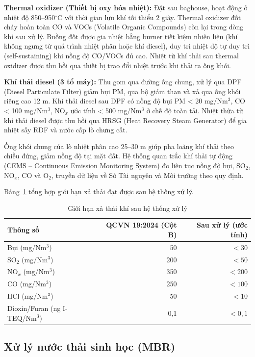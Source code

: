 \documentclass[../main.tex]{subfiles}
\begin{document}
\textbf{Thermal oxidizer (Thiết bị oxy hóa nhiệt):} Đặt sau baghouse, hoạt động ở nhiệt độ 850--950$^\circ\mathrm{C}$ với thời gian lưu khí tối thiểu 2 giây. Thermal oxidizer đốt cháy hoàn toàn CO và VOCs (Volatile Organic Compounds) còn lại trong dòng khí sau xử lý. Buồng đốt được gia nhiệt bằng burner tiết kiệm nhiên liệu (khí không ngưng từ quá trình nhiệt phân hoặc khí diesel), duy trì nhiệt độ tự duy trì (self-sustaining) khi nồng độ CO/VOCs đủ cao. Nhiệt từ khí thải sau thermal oxidizer được thu hồi qua thiết bị trao đổi nhiệt trước khi thải ra ống khói.

\textbf{Khí thải diesel (3 tổ máy):} Thu gom qua đường ống chung, xử lý qua DPF (Diesel Particulate Filter) giảm bụi PM, qua bộ giảm than và xả qua ống khói riêng cao 12 m. Khí thải diesel sau DPF có nồng độ bụi PM < 20 mg/Nm$^3$, CO < 100 mg/Nm$^3$, NO$_x$ ước tính < 500 mg/Nm$^3$ ở chế độ toàn tải. Nhiệt thừa từ khí thải diesel được thu hồi qua HRSG (Heat Recovery Steam Generator) để gia nhiệt sấy RDF và nước cấp lò chưng cất.

Ống khói chung của lò nhiệt phân cao 25--30 m giúp pha loãng khí thải theo chiều đứng, giảm nồng độ tại mặt đất. Hệ thống quan trắc khí thải tự động (CEMS -- Continuous Emission Monitoring System) đo liên tục nồng độ bụi, SO$_2$, NO$_x$, CO và O$_2$, truyền dữ liệu về Sở Tài nguyên và Môi trường theo quy định.

Bảng~\ref{tab:gioi-han-khi-thai} tổng hợp giới hạn xả thải đạt được sau hệ thống xử lý.

\begin{table}[H]
\caption{Giới hạn xả thải khí sau hệ thống xử lý}
\label{tab:gioi-han-khi-thai}
\centering
\begin{tabular}{p{3.5cm} r r}
\toprule
\textbf{Thông số} & \textbf{QCVN 19:2024 (Cột B)} & \textbf{Sau xử lý (ước tính)} \\
\midrule
Bụi (mg/Nm$^3$) & 50 & $< 30$ \\
SO$_2$ (mg/Nm$^3$) & 200 & $< 50$ \\
NO$_x$ (mg/Nm$^3$) & 350 & $< 200$ \\
CO (mg/Nm$^3$) & 250 & $< 100$ \\
HCl (mg/Nm$^3$) & 50 & $< 10$ \\
Dioxin/Furan (ng I-TEQ/Nm$^3$) & 0,1 & $< 0{,}1$ \\
\bottomrule
\end{tabular}
\end{table}

\subsection{Xử lý nước thải sinh học (MBR)}
\end{document}
